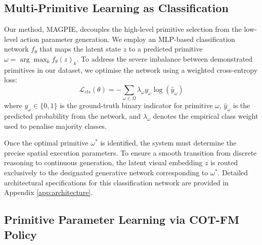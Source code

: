 \documentclass[journal]{IEEEtran}
\begin{document}

\subsection{Multi-Primitive Learning as Classification}
\label{sec:classification}

Our method, MAGPIE, decouples the high-level primitive selection from the low-level action parameter generation. We employ an MLP-based classification network $f_\theta$ that maps the latent state $z$ to a predicted primitive $\omega = \arg\max_k f_{\theta}(z)_k$. To address the severe imbalance between demonstrated primitives in our dataset, we optimise the network using a weighted cross-entropy loss:
$$\mathcal{L}_{cls}(\theta) = - \sum_{\omega \in \Omega} \lambda_\omega y_\omega \log(\hat{y}_\omega)$$
where $y_\omega \in \{0, 1\}$ is the ground-truth binary indicator for primitive $\omega$, $\hat{y}_\omega$ is the predicted probability from the network, and $\lambda_\omega$ denotes the empirical class weight used to penalise majority classes. 

Once the optimal primitive $\omega^*$ is identified, the system must determine the precise spatial execution parameters. To ensure a smooth transition from discrete reasoning to continuous generation, the latent visual embedding $z$ is routed exclusively to the designated generative network corresponding to $\omega^*$. Detailed architectural specifications for this classification network are provided in Appendix \ref{app:architecture}.

\subsection{Primitive Parameter Learning via COT-FM Policy}
\label{sec:cot_fm_learning}
\end{document}
